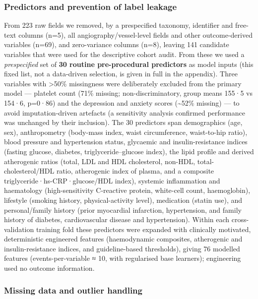 \documentclass[
  english,
  11pt,
]{article}
\begin{document}
\subsubsection{Predictors and prevention of label
leakage}\label{predictors-and-prevention-of-label-leakage}

From 223 raw fields we removed, by a prespecified taxonomy, identifier
and free-text columns (n=5), all angiography/vessel-level fields and
other outcome-derived variables (n=69), and zero-variance columns (n=8),
leaving 141 candidate variables that were used for the descriptive
cohort audit. From these we used a \emph{prespecified} set of \textbf{30
routine pre-procedural predictors} as model inputs (this fixed list, not
a data-driven selection, is given in full in the appendix). Three
variables with \textgreater50\% missingness were deliberately excluded
from the primary model --- platelet count (71\% missing;
non-discriminatory, group means 155·5 vs 154·6, p=0·86) and the
depression and anxiety scores (\textasciitilde52\% missing) --- to avoid
imputation-driven artefacts (a sensitivity analysis confirmed
performance was unchanged by their inclusion). The 30 predictors span
demographics (age, sex), anthropometry (body-mass index, waist
circumference, waist-to-hip ratio), blood pressure and hypertension
status, glycaemic and insulin-resistance indices (fasting glucose,
diabetes, triglyceride--glucose index), the lipid profile and derived
atherogenic ratios (total, LDL and HDL cholesterol, non-HDL,
total-cholesterol/HDL ratio, atherogenic index of plasma, and a
composite triglyceride·hs-CRP·glucose/HDL index), systemic inflammation
and haematology (high-sensitivity C-reactive protein, white-cell count,
haemoglobin), lifestyle (smoking history, physical-activity level),
medication (statin use), and personal/family history (prior myocardial
infarction, hypertension, and family history of diabetes, cardiovascular
disease and hypertension). Within each cross-validation training fold
these predictors were expanded with clinically motivated, deterministic
engineered features (haemodynamic composites, atherogenic and
insulin-resistance indices, and guideline-based thresholds), giving 76
modelled features (events-per-variable ≈ 10, with regularised base
learners); engineering used no outcome information.

\subsubsection{Missing data and outlier
handling}\label{missing-data-and-outlier-handling}
\end{document}
